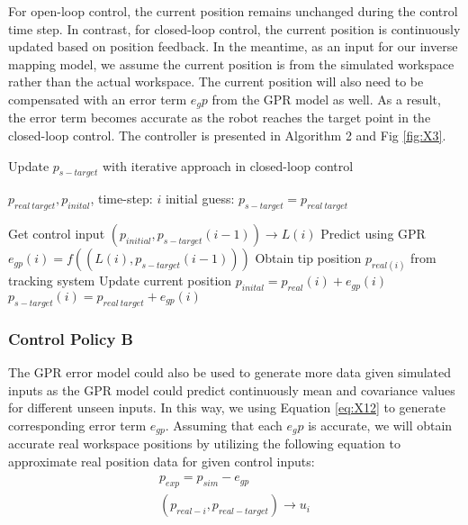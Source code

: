 For open-loop control, the current position remains unchanged during the control time step. In contrast, for closed-loop control, the current position is continuously updated based on position feedback. In the meantime, as an input for our inverse mapping model, we assume the current position is from the simulated workspace rather than the actual workspace. The current position will also need to be compensated with an error term  $e_gp$ from the GPR model as well. As a result, the error term becomes accurate as the robot reaches the target point in the closed-loop control. The controller is presented in Algorithm 2 and Fig \ref{fig:X3}.

\begin{algorithm}[t]
\caption{Update $p_{s-target}$ with iterative approach in closed-loop control}
\label{alg:X2}
\begin{algorithmic}
\Require $p_{real\: target}, p_{inital}$, time-step: $i$
\State initial guess: $p_{s-target} = p_{real\:target}$

\State Get control input  $(p_{initial},p_{s-target}(i-1))\rightarrow L(i)$
\State Predict using GPR $e_{gp}(i)=f((L(i),p_{s-target}(i-1)))$
\State Obtain tip position $p_{real(i)}$ from  tracking system
\State Update current position $p_{inital} = p_{real}(i) +  e_{gp}(i)$
\State $p_{s-target}(i) = p_{real\: target}+e_{gp}(i) $

\EndWhile
\end{algorithmic}
\end{algorithm}

\subsubsection{Control Policy B}

 The GPR error model could also be used to generate more data given simulated inputs as the GPR model could predict continuously mean and covariance values for different unseen inputs. In this way, we using Equation \eqref{eq:X12} to generate corresponding error term $e_{gp}$. Assuming that each $e_gp$ is accurate, we will obtain accurate real workspace positions by utilizing the following equation to approximate real position data for given control inputs:
\begin{align}
    \begin{split}
    p_{exp} = p_{sim}-e_{gp}\\
    (p_{real-i}, p_{real-target})\rightarrow u_i\\
    \end{split}
    \label{eq:X16}
\end{align}

